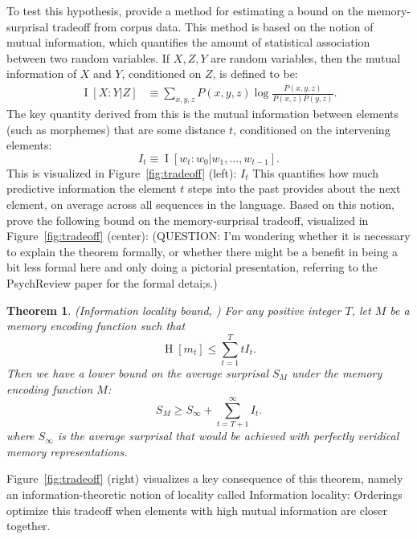 \documentclass[11pt,letterpaper]{article}
\newcommand{\citet}{\Textcite}
\newcommand\mhahn[1]{{\color{red}(#1)}}
\newcounter{theorem}
\newcounter{def}
\newtheorem{thm}[theorem]{Theorem}
\begin{document}
To test this hypothesis, \citet{Hahn2020modeling} provide a method for estimating a bound on the memory-surprisal tradeoff from corpus data.
This method is based on the notion of mutual information, which quantifies the amount of statistical association between two random variables.
If $X, Z, Y$ are random variables, then the mutual information of $X$ and $Y$, conditioned on $Z$, is defined to be:
\begin{align}
\label{eq:mi}
    \operatorname{I}[X:Y|Z] &\equiv \sum_{x,y,z} P(x,y,z) \log \frac{P(x,y,z)}{P(x,z)P(y,z)}. %
\end{align}
The key quantity derived from this is the mutual information between elements (such as morphemes) that are some distance $t$, conditioned on the intervening elements:
\begin{equation*}
    I_t \equiv \operatorname{I}[w_t : w_0 | w_1, \dots, w_{t-1}].
\end{equation*}
This is visualized in Figure~\ref{fig:tradeoff} (left): $I_t$ This quantifies how much predictive information the element $t$ steps into the past provides about the next element, on average across all sequences in the language.
Based on this notion, \citet{Hahn2020modeling}  prove the following bound on the memory-surprisal tradeoff, visualized in Figure~\ref{fig:tradeoff} (center):
\mhahn{QUESTION: I'm wondering whether it is necessary to explain the theorem formally, or whether there might be a benefit in being a bit less formal here and only doing a pictorial presentation, referring to the PsychReview paper for the formal detai;s.}
\begin{thm}\label{prop:suboptimal}(Information locality bound, \citet{Hahn2020modeling})
For any positive integer $T$, let $M$ be a memory encoding function such that
\begin{equation}
\label{eq:memory-bound}
\operatorname{H}[m_t] \le \sum_{t=1}^T t I_t.
\end{equation}
Then we have a lower bound on the average surprisal $S_M$ under the memory encoding function $M$:
\begin{equation}
\label{eq:surprisal-bound}
S_M \ge S_\infty + \sum_{t=T+1}^\infty I_t.
\end{equation}
where $S_\infty$ is the average surprisal that would be achieved with perfectly veridical memory representations.
\end{thm}
Figure~\ref{fig:tradeoff} (right) visualizes a key consequence of this theorem, namely an information-theoretic notion of locality called Information locality:
Orderings optimize this tradeoff when elements with high mutual information are closer together.
\end{document}
